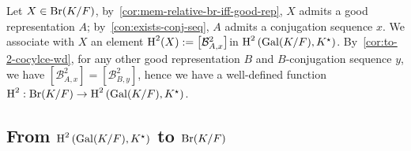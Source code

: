 \begin{construction}\label{con:br-to-snd-coh}
  Let $X \in \operatorname{Br}(K/F)$, by~\cref{cor:mem-relative-br-iff-good-rep}, $X$ admits a good representation $A$; by~\cref{con:exists-conj-seq}, $A$ admits a conjugation sequence $x$. We associate with $X$ an element $\operatorname{H}^{2}(X) := \left[\mathcal{B}^{2}_{A,x}\right]$in $\operatorname{H}^{2}\left(\operatorname{Gal}(K/F),K^{\star}\right)$. By~\cref{cor:to-2-cocylce-wd}, for any other good representation $B$ and $B$-conjugation sequence $y$, we have $\left[\mathcal{B}^{2}_{A,x}\right]=\left[\mathcal{B}^{2}_{B,y}\right]$, hence we have a well-defined function $\operatorname{H}^{2} : \operatorname{Br}(K/F) \to \operatorname{H}^{2}\left(\operatorname{Gal}(K/F),K^{\star}\right)$.
  \leanok
\end{construction}

\subsection{From $\operatorname{H}^{2}\left(\operatorname{Gal}(K/F), K^{\star}\right)$ to $\operatorname{Br}(K/F)$}


